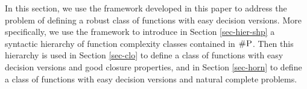 In this section, we use the framework developed in this paper to address the problem of defining a robust class of functions with easy decision versions. More specifically, we use the framework to introduce in Section \ref{sec-hier-shp} a syntactic hierarchy of function complexity classes contained in $\text{\sc \#P}$. Then this hierarchy is used in Section \ref{sec-clo} to define a class of functions with easy decision versions and good closure properties, and in Section \ref{sec-horn} to define a class of functions with easy decision versions and 
natural complete problems.

%
